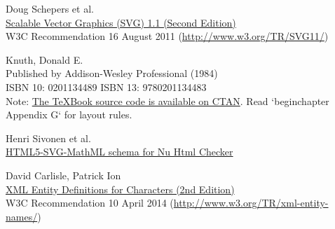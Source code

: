 \begin{thebibliography}{25}
Doug Schepers et al. \\
\href{http://www.w3.org/TR/SVG11/}{Scalable Vector Graphics (SVG) 1.1 (Second Edition)} \\
W3C Recommendation 16 August 2011 (\href{http://www.w3.org/TR/SVG11/}{http://www.w3.org/TR/SVG11/})

Knuth, Donald E. \\
Published by Addison-Wesley Professional (1984) \\
ISBN 10: 0201134489 ISBN 13: 9780201134483 \\
Note: \href{http://www.ctan.org/pkg/texbook}{The TeXBook source code is
available on CTAN}. Read `beginchapter Appendix G` for layout rules.

Henri Sivonen et al. \\
\href{https://github.com/validator/validator/blob/master/schema/.drivers/html5-svg-mathml.rnc}{HTML5-SVG-MathML schema for Nu Html Checker}

David Carlisle, Patrick Ion \\
\href{http://www.w3.org/TR/xml-entity-names/}{XML Entity Definitions for Characters (2nd Edition)} \\
W3C Recommendation 10 April 2014 (\href{http://www.w3.org/TR/xml-entity-names/}{http://www.w3.org/TR/xml-entity-names/})

\end{thebibliography}
